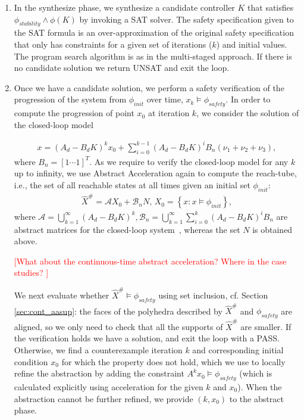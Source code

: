 \documentclass[twocolumn]{autart}    %
\newcommand{\mat}[1]{{#1}}
\renewcommand{\vec}[1]{{#1}}
\renewcommand{\note}[1]{\textcolor{red}{[#1]}}
\begin{document}
\begin{enumerate}
\begin{enumerate}
\end{enumerate}
\item In the {\sc synthesize} phase, we synthesize a candidate controller
  $K$ 
  that satisfies
  $\phi_\mathit{stability} \wedge \phi (K)$ by invoking a SAT solver.  
  The safety specification given to the SAT formula is an over-approximation of the original safety specification that only has constraints for a given set of iterations ($k$) and initial values.  
 The program search algorithm is as in the multi-staged approach.  
If there is no candidate solution we return UNSAT and exit the loop. 
\item Once we have a candidate solution, we perform a safety verification 
  of the 
  progression of the system from $\phi_\mathit{init}$ over time,
$x_{k} \models \phi_\mathit{safety}$. 
  In order to compute the progression of point $x_0$ at iteration $k$,
  we consider the solution of the closed-loop model 

{
\scriptsize
\begin{align*}
x=(A_d-B_dK)^kx_0+ \sum_{i=0}^{k-1} (A_d-B_dK)^i B_{n}(\nu_1+\nu_2+\nu_3), 
\end{align*}
}
where $B_n= [1 \cdots 1]^T$. 
As we require to verify the closed-loop model for any $k$ up to infinity, 
we use Abstract Acceleration again to compute the reach-tube, 
i.e., the set of all reachable states at all times given an initial set
$\phi_\mathit{init}$:
%
\begin{align}
\label{eq:aa_observer_LTI_cf}
\hat{X}^\#
=\mathcal{A} X_0 + \mathcal{B}_{n} N, \,
X_0 =\left \{x: x \models \phi_\mathit{init} \right\}, 
\end{align} 
%
where $\mathcal{A}=\bigcup_{k=1}^\infty (A_d-B_dK)^k,
\mathcal{B}_{n}=\bigcup_{k=1}^\infty \sum_{i=0}^k(A_d-B_dK)^iB_{n}$ are
abstract matrices for the closed-loop system~\cite{cattaruzza2015unbounded},
whereas the set $N$ is obtained above. 

\note{What about the continuous-time abstract acceleration? Where in the case studies? }

We next evaluate whether $\hat{X}^\# \models \phi_\mathit{safety}$ using set inclusion, cf. Section \ref{sec:cont_aasup}: 
the faces of the polyhedra described by $\hat{X}^\#$ and $\phi_\mathit{safety}$ are aligned, so we only need to check that all the supports of $\hat{X}^\#$ are smaller.   
If the verification holds we have a solution, and exit the loop with a PASS.  Otherwise, we
find a counterexample iteration $k$ and corresponding initial condition $x_0$
for which the property does not hold, which we use to locally refine the
abstraction by adding the constraint $\mat{A}^k\vec{x}_0 \models \phi_\mathit{safety}$ (which is calculated explicitly using acceleration for the given $k$ and $\vec{x}_0$).  
When the abstraction cannot be further refined, we provide $(k, x_0)$ to the {\sc abstract} phase.


\end{enumerate}
\end{document}
